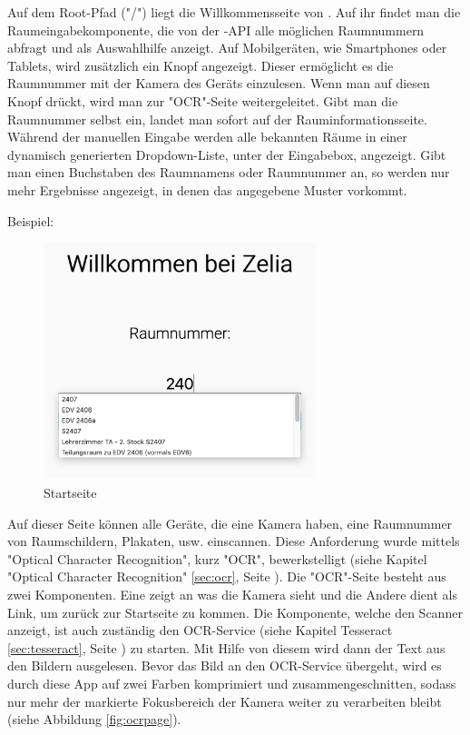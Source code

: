 \begin{minipage}{\textwidth}
    \label{sec:webcompstart}
    
    Auf dem Root-Pfad ("/") liegt die Willkommensseite von \ZELIA. Auf ihr findet man die Raumeingabekomponente, die von der \ZELIA-API alle möglichen Raumnummern abfragt und als Auswahlhilfe anzeigt. Auf Mobilgeräten, wie Smartphones oder Tablets, wird zusätzlich ein Knopf angezeigt. Dieser ermöglicht es die Raumnummer mit der Kamera des Geräts einzulesen. Wenn man auf diesen Knopf drückt, wird man zur "OCR"-Seite weitergeleitet. Gibt man die Raumnummer selbst ein, landet man sofort auf der Rauminformationsseite. Während der manuellen Eingabe werden alle bekannten Räume in einer dynamisch generierten Dropdown-Liste, unter der Eingabebox, angezeigt. Gibt man einen Buchstaben des Raumnamens oder Raumnummer an, so werden nur mehr Ergebnisse angezeigt, in denen das angegebene Muster vorkommt.
\end{minipage}

Beispiel:

\begin{figure}[H]
    \centering
    \includegraphics[width=80mm]{media/WebComponents/Startseite_light.png}
    \caption{Startseite}
    \label{fig:compinput}
\end{figure}



Auf dieser Seite können alle Geräte, die eine Kamera haben, eine Raumnummer von Raumschildern, Plakaten, usw. einscannen. Diese Anforderung wurde mittels "Optical Character Recognition", kurz "OCR", bewerkstelligt (siehe Kapitel "Optical Character Recognition" \ref{sec:ocr}, Seite \pageref{sec:ocr}). Die "OCR"-Seite besteht aus zwei Komponenten. Eine zeigt an was die Kamera sieht und die Andere dient als Link, um zurück zur Startseite zu kommen. Die Komponente, welche den Scanner anzeigt, ist auch zuständig den OCR-Service (siehe Kapitel Tesseract \ref{sec:tesseract}, Seite \pageref{sec:tesseract}) zu starten. Mit Hilfe von diesem wird dann der Text aus den Bildern ausgelesen. Bevor das Bild an den OCR-Service übergeht, wird es durch diese App auf zwei Farben komprimiert und zusammengeschnitten, sodass nur mehr der markierte Fokusbereich der Kamera weiter zu verarbeiten bleibt (siehe Abbildung \ref{fig:ocrpage}).

